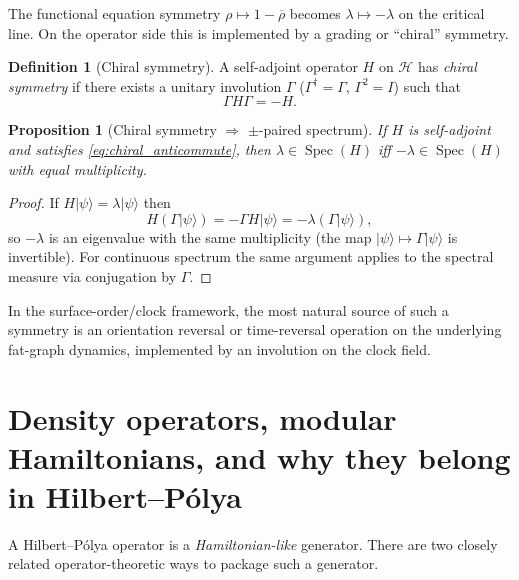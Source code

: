 \documentclass[11pt,oneside]{amsbook}
\numberwithin{equation}{section}
\theoremstyle{plain}
\newtheorem{proposition}[theorem]{Proposition}
\theoremstyle{definition}
\newtheorem{definition}[theorem]{Definition}
\theoremstyle{remark}
\DeclareMathOperator{\Spec}{\mathrm{Spec}}
\newcommand{\ket}[1]{\lvert #1 \rangle}
\begin{document}
The functional equation symmetry $\rho\mapsto 1-\overline{\rho}$ becomes $\lambda\mapsto -\lambda$ on the critical line.
On the operator side this is implemented by a grading or ``chiral'' symmetry.

\begin{definition}[Chiral symmetry]
A self-adjoint operator $H$ on $\mathcal{H}$ has \emph{chiral symmetry} if there exists a unitary involution $\Gamma$ ($\Gamma^\dagger=\Gamma$, $\Gamma^2=I$) such that
\begin{equation}
\label{eq:chiral_anticommute}
\Gamma H \Gamma = -H.
\end{equation}
\end{definition}

\begin{proposition}[Chiral symmetry $\Rightarrow$ $\pm$-paired spectrum]
\label{prop:chiral_pairs}
If $H$ is self-adjoint and satisfies \eqref{eq:chiral_anticommute}, then $\lambda\in\Spec(H)$ iff $-\lambda\in\Spec(H)$ with equal multiplicity.
\end{proposition}

\begin{proof}
If $H\ket{\psi}=\lambda\ket{\psi}$ then
\[
H(\Gamma\ket{\psi}) = -\Gamma H\ket{\psi} = -\lambda(\Gamma\ket{\psi}),
\]
so $-\lambda$ is an eigenvalue with the same multiplicity (the map $\ket{\psi}\mapsto\Gamma\ket{\psi}$ is invertible).
For continuous spectrum the same argument applies to the spectral measure via conjugation by $\Gamma$.
\end{proof}

In the surface-order/clock framework, the most natural source of such a symmetry is an orientation reversal or time-reversal operation on the underlying fat-graph dynamics, implemented by an involution on the clock field.

\section{Density operators, modular Hamiltonians, and why they belong in Hilbert--Pólya}
\label{sec:density_modular_hp}

A Hilbert--Pólya operator is a \emph{Hamiltonian-like} generator.
There are two closely related operator-theoretic ways to package such a generator.
\end{document}
